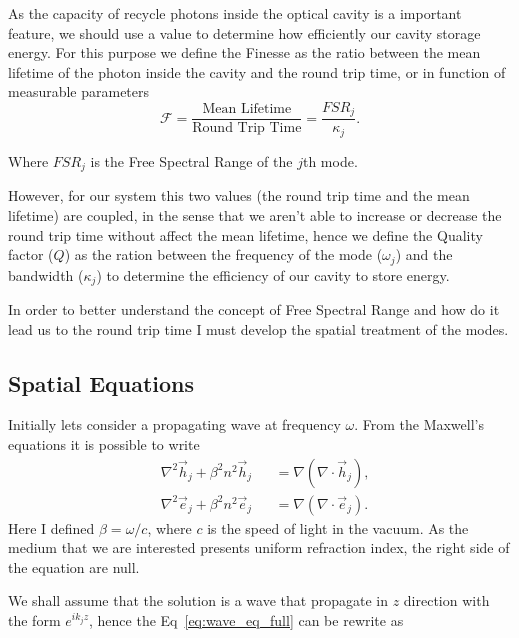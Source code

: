 As the capacity of recycle photons inside the optical cavity is a important feature, we should use a value to determine how efficiently our cavity storage energy. For this purpose we define the Finesse as the ratio between the mean lifetime of the photon inside the cavity and the round trip time, or in function of measurable parameters 
\begin{equation}
    \mathcal{F} = \frac{\text{Mean Lifetime}}{\text{Round Trip Time}} = \frac{FSR_j}{\kappa_j}.
    \label{eq:finesse}
\end{equation}

Where $FSR_j$ is the Free Spectral Range of the $j$th mode.

However, for our system this two values (the round trip time and the mean lifetime) are coupled, in the sense that we aren't able to increase or decrease the round trip time without affect the mean lifetime, hence we define the Quality factor ($Q$) as the ration between the frequency of the mode ($\omega_j$) and the bandwidth ($\kappa_j$) to determine the efficiency of our cavity to store energy. 

In order to better understand the concept of Free Spectral Range and how do it lead us to the round trip time I must develop the spatial treatment of the modes. 

\subsection{Spatial Equations}

Initially lets consider a propagating wave at frequency $\omega$. From the Maxwell's equations it is possible to write
\begin{subequations}
    \begin{alignat}{2}
    &\nabla^2\vec{h}_j+\beta^2n^2\vec{h}_j &&= \nabla(\nabla\cdot\vec{h}_j),\\
    &\nabla^2\vec{e}_j+\beta^2n^2\vec{e}_j &&= \nabla(\nabla\cdot\vec{e}_j).
    \end{alignat}
    \label{eq:wave_eq_full}
\end{subequations}
Here I defined $\beta = \omega/c$, where $c$ is the speed of light in the vacuum. As the medium that we are interested presents uniform refraction index, the right side of the equation are null. 

We shall assume that the solution is a wave that propagate in $z$ direction with the form $e^{ik_jz}$, hence the Eq~\ref{eq:wave_eq_full} can be rewrite as 

